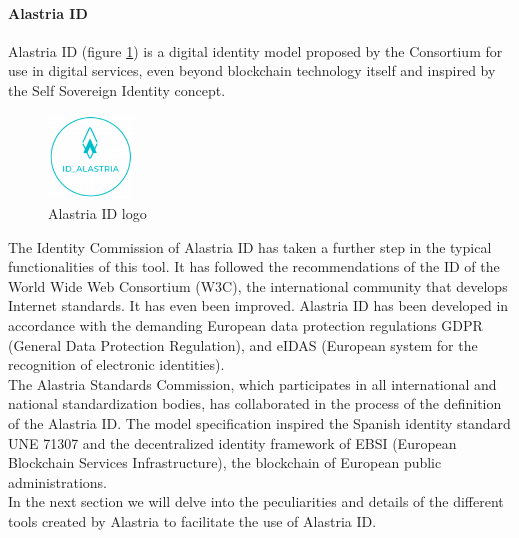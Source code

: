 \documentclass[a4paper, 12pt]{article} %
\begin{document}
                \paragraph{Alastria ID}
                    Alastria ID (figure \ref{fig:alastria_id_logo}) is a digital identity model proposed by the Consortium for use in digital services, even beyond blockchain technology itself and inspired by the Self Sovereign Identity concept.\\
                    \begin{figure}[h]
                        \centering
                        \includegraphics[width=0.2\textwidth]{alastria-id-logo.png}
                        \caption{Alastria ID logo}
                        \label{fig:alastria_id_logo}
                    \end{figure}
                
                    The Identity Commission of Alastria ID\cite{alastria-context} has taken a further step in the typical functionalities of this tool. It has followed the recommendations of the ID of the World Wide Web Consortium\cite{w3c} (W3C), the international community that develops Internet standards. It has even been improved. Alastria ID has been developed in accordance with the demanding European data protection regulations GDPR\cite{gdpr} (General Data Protection Regulation), and eIDAS\cite{eidas} (European system for the recognition of electronic identities).\\

                    The Alastria Standards Commission, which participates in all international and national standardization bodies, has collaborated in the process of the definition of the Alastria ID. The model specification inspired the Spanish identity standard UNE 71307\cite{une-71307} and the decentralized identity framework of EBSI\cite{ebsi} (European Blockchain Services Infrastructure), the blockchain of European public administrations.\\
                    
                    In the next section we will delve into the peculiarities and details of the different tools created by Alastria to facilitate the use of Alastria ID.
\end{document}
